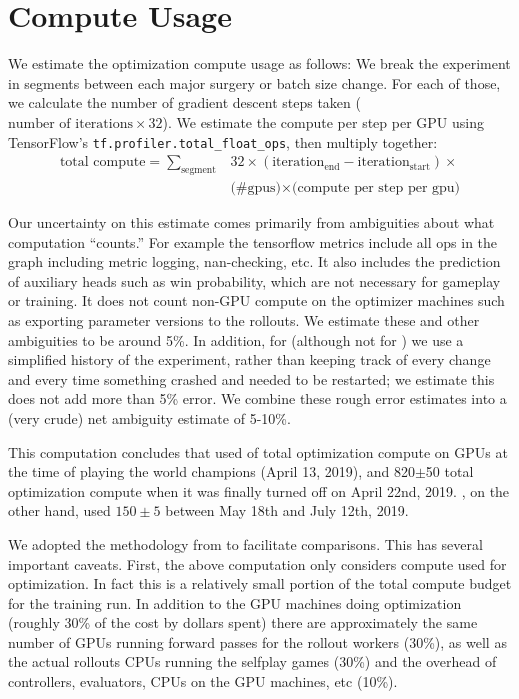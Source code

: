 \documentclass[ocean-paper.tex]{subfiles}
\begin{document}
\section{Compute Usage}\label{sec:compute}
We estimate the optimization compute usage as follows: We break the experiment in segments between each major surgery or batch size change. For each of those, we calculate the number of gradient descent steps taken ($\textrm{number of iterations} \times 32$). We estimate the compute per step per GPU using TensorFlow's \texttt{tf.profiler.total\_float\_ops}, then multiply together:
\begin{align}
\textrm{total compute} = \sum_{\textrm{segment}} & 32 \times (\textrm{iteration}_\textrm{end} - \textrm{iteration}_\textrm{start}) \times \\
& \textrm{(\# gpus)} \times \textrm{(compute per step per gpu)}
\end{align}

Our uncertainty on this estimate comes primarily from ambiguities about what computation ``counts.''
For example the tensorflow metrics include all ops in the graph including metric logging, nan-checking, etc. 
It also includes the prediction of auxiliary heads such as win probability, which are not necessary for gameplay or training.
It does not count non-GPU compute on the optimizer machines such as exporting parameter versions to the rollouts.
We estimate these and other ambiguities to be around 5\%. 
In addition, for \openaifive (although not for \cleanexpname) we use a simplified history of the experiment, rather than keeping track of every change and every time something crashed and needed to be restarted; we estimate this does not add more than 5\% error. 
We combine these rough error estimates into a (very crude) net ambiguity estimate of 5-10\%.

This computation concludes that \openaifive used \totalcompute of total optimization compute on GPUs at the time of playing the world champions (April 13, 2019), and 820$\pm$50 total optimization compute when it was finally turned off on April 22nd, 2019. 
\cleanexpname, on the other hand, used $150\pm5$ \pflopsday %
 between May 18th and July 12th, 2019.

We adopted the methodology from \cite{openaicomputeblog} to facilitate comparisons. This has several important caveats. 
First, the above computation only considers compute used for optimization.
In fact this is a relatively small portion of the total compute budget for the training run.
In addition to the GPU machines doing optimization (roughly 30\% of the cost by dollars spent) %
there are approximately the same number of GPUs running forward passes for the rollout workers (30\%), %
as well as the actual rollouts CPUs running the selfplay games (30\%) %
and the overhead of controllers, \trueskillname evaluators, CPUs on the GPU machines, etc (10\%). %
\end{document}
